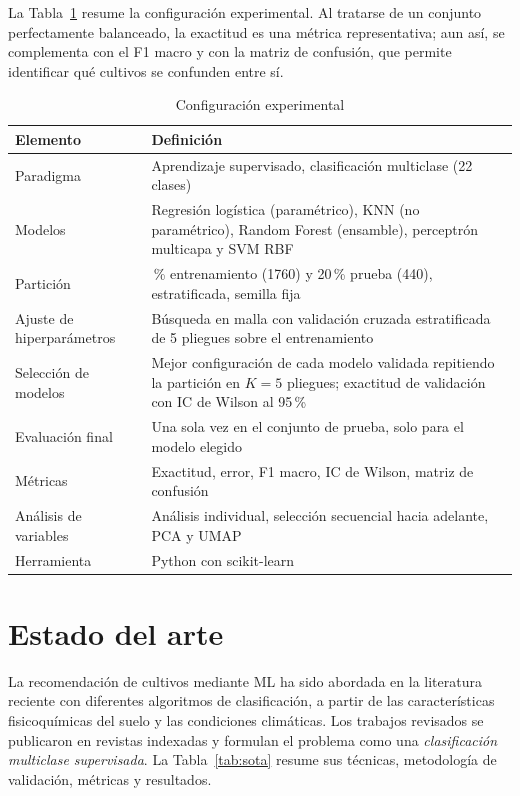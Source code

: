 \documentclass[conference]{IEEEtran}
\begin{document}
La Tabla~\ref{tab:diseno} resume la configuración experimental. Al tratarse de un conjunto perfectamente balanceado, la exactitud es una métrica representativa; aun así, se complementa con el F1 macro y con la matriz de confusión, que permite identificar qué cultivos se confunden entre sí.

\begin{table}[htbp]
\caption{Configuración experimental}
\label{tab:diseno}
\centering
\footnotesize
\begin{tabular}{>{\raggedright\arraybackslash}p{2.1cm}>{\raggedright\arraybackslash}p{5.3cm}}
\toprule
\textbf{Elemento} & \textbf{Definición} \\
\midrule
Paradigma & Aprendizaje supervisado, clasificación multiclase (22 clases) \\
Modelos & Regresión logística (paramétrico), KNN (no paramétrico), Random Forest (ensamble), perceptrón multicapa y SVM RBF \\
Partición & 80\,\% entrenamiento (1760) y 20\,\% prueba (440), estratificada, semilla fija \\
Ajuste de hiperparámetros & Búsqueda en malla con validación cruzada estratificada de 5 pliegues sobre el entrenamiento \\
Selección de modelos & Mejor configuración de cada modelo validada repitiendo la partición en $K=5$ pliegues; exactitud de validación con IC de Wilson al 95\,\% \\
Evaluación final & Una sola vez en el conjunto de prueba, solo para el modelo elegido \\
Métricas & Exactitud, error, F1 macro, IC de Wilson, matriz de confusión \\
Análisis de variables & Análisis individual, selección secuencial hacia adelante, PCA y UMAP \\
Herramienta & Python con scikit-learn \cite{pedregosa2011} \\
\bottomrule
\end{tabular}
\end{table}

\section{Estado del arte}
\label{sec:sota}

La recomendación de cultivos mediante ML ha sido abordada en la literatura reciente con diferentes algoritmos de clasificación, a partir de las características fisicoquímicas del suelo y las condiciones climáticas. Los trabajos revisados se publicaron en revistas indexadas y formulan el problema como una \emph{clasificación multiclase supervisada}. La Tabla~\ref{tab:sota} resume sus técnicas, metodología de validación, métricas y resultados.
\end{document}
